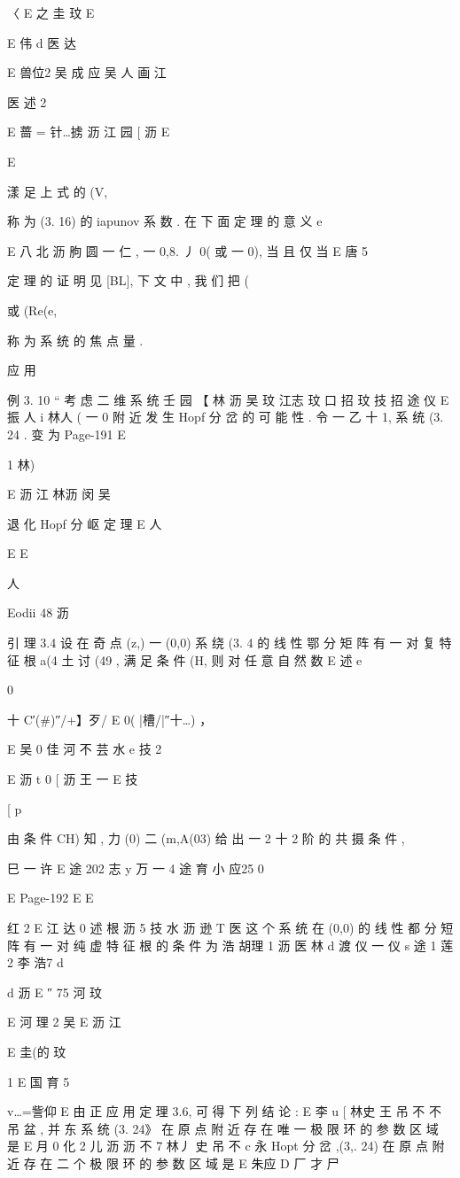 {{{{{{{{{{{{{{{{{{〈 E 之 圭 玟
E

E 伟 d
医 达

E 兽位2 吴 成 应 吴 人 画 江

医 述 2

E
蔷 = 针…掳 沥 江 园 [ 沥
E

E

漾 足 上 式 的 (V,} 称 为 (3. 16) 的 iapunov 系 数 . 在 下 面 定 理 的 意 义
e

E 八 北 沥 朐 圆 一 仁 , 一 0,8. 丿 0( 或 一 0), 当 且 仅 当
E 唐 5

定 理 的 证 明 见 [BL], 下 文 中 , 我 们 把 (} 或 (Re(e,} 称 为 系
统 的 焦 点 量 .

应 用

例 3. 10 “ 考 虑 二 维 系 统
壬 园 【
林 沥 吴 玟 江志 玟 口 招 玟 技 招 途 仪
E 振 人 i 林人
( 一 0 附 近 发 生 Hopf 分 岔 的 可 能 性 . 令 一 乙 十 1, 系 统 (3. 24
. 变 为
Page-191
E

1 林)

E 沥 江 林沥 闵 吴

退 化 Hopf 分 岖 定 理
E 人

E
E

人

Eodii 48 沥

引 理 3.4 设 在 奇 点 (z,) 一 (0,0) 系 绕 (3. 4 的 线 性 鄂 分 矩
阵 有 一 对 复 特 征 根 a(4 土 讨 (49 , 满 足 条 件 (H, 则 对 任 意 自 然 数
E 述
e

0

十 C′(#)″/+】歹/ E 0( |槽/|″十…) ，

E 吴 0 佳 河 不 芸 水
e 技 2

E 沥 t 0
[ 沥 王 一
E 技

[ p

由 条 件 CH) 知 , 力 (0) 二 (m,A(03) 给 出 一 2 十 2 阶 的 共 摄 条 件 ,

巳 一 许
E 途 202 志 y 万 一 4 途 育 小 应25
0

E
Page-192
E
E

红 2
E 江 达 0 述
根 沥 5 技 水 沥 逊 T 医
这 个 系 统 在 (0,0) 的 线 性 都 分 短 阵 有 一 对 纯 虚 特 征 根 的 条 件 为
浩 胡理 1 沥
医 林 d 渡 仪 一 仪 s 途 1 莲 2 李 浩7
d

d 沥 E
″ 75 河 玟

E 河 理 2 吴
E 沥 江

E 圭(的 玟

1
E
国 育 5

v…=訾仰 E
由 正 应 用 定 理 3.6, 可 得 下 列 结 论 :
E 李 u [ 林史 王 吊 不 不 吊
盆 , 并 东 系 统 (3. 24》 在 原 点 附 近 存 在 唯 一 极 限 环 的 参 数 区 域 是
E 月
0 化 2 儿 沥 沥 不 7 林丿 史 吊 不 c 永
Hopt 分 岔 ,(3,. 24) 在 原 点 附 近 存 在 二 个 极 限 环 的 参 数 区 域 是
E 朱应
D 厂 才 尸

}}}}}}}}}}}}}}}
